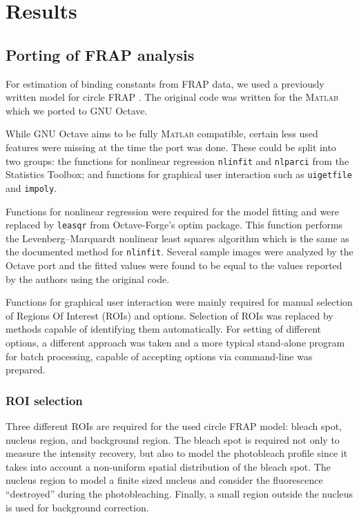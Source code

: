 \section{Results}

  \subsection{Porting of FRAP analysis}

    For estimation of binding constants from FRAP data, we used a
    previously written model for circle FRAP \citep{mueller2008evidence}.
    The original code was written for the \textsc{Matlab} which we
    ported to GNU Octave.

    While GNU Octave aims to be fully \textsc{Matlab} compatible, certain
    less used features were missing at the time the port was done.
    These could be split into two groups: the functions for nonlinear
    regression \texttt{nlinfit} and \texttt{nlparci} from the Statistics
    Toolbox; and functions for graphical user
    interaction such as \texttt{uigetfile} and \texttt{impoly}.

    Functions for nonlinear regression were required for the model
    fitting and were replaced by \texttt{leasqr}
    from Octave-Forge's optim package. This function performs the
    Levenberg--Marquardt nonlinear least squares algorithm which is the
    same as the documented method for \texttt{nlinfit}.
    Several sample images were analyzed
    by the Octave port and the fitted values were found to be equal to
    the values reported by the authors using the original code.

    Functions for graphical user interaction were mainly required
    for manual selection of Regions Of Interest (ROIs) and options.
    Selection of ROIs was replaced by methods capable of identifying
    them automatically. For setting of different options, a different
    approach was taken and a more typical stand-alone program for batch
    processing, capable of accepting options via command-line was prepared.

    \subsubsection{ROI selection}

      Three different ROIs are required for the used circle FRAP model:
      bleach spot, nucleus region, and background region. The bleach
      spot is required not only to measure the intensity recovery, but
      also to model the photobleach profile since it takes into account
      a non-uniform spatial distribution of the bleach spot. The nucleus
      region to model a finite sized nucleus and consider the fluorescence
      ``destroyed'' during the photobleaching. Finally, a small region
      outside the nucleus is used for background correction.

